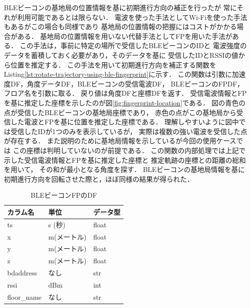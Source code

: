BLEビーコンの基地局の位置情報を基に初期進行方向の補正を行ったが
常にそれが利用可能であるとは限らない．
電波を使った手法としてWi-Fiを使った手法もあるがこの場合も同様であり
基地局の位置情報の把握にはコストがかかる場合がある．
基地局の位置情報を用いない代替手法としてFPを用いた手法がある．
この手法は，事前に特定の場所で受信したBLEビーコンのIDと
電波強度のデータを蓄積しておく必要があり，そのデータを基に
受信したIDとRSSIの値から位置を推定する．
この手法を用いて初期進行方向を補正する関数を
Listing\ref{lst:rotate-trajectory-using-ble-fingerprint}に示す．
この関数は引数に加速度DF，角度データDF，BLEビーコンの受信電波DF，
BLEビーコンのFPDF，フロア名を引数に取る．
戻り値は角度DFと座標DFを返す．
受信電波情報とFPを基に推定した座標を示したのが図\ref{fig:fingerprint-location}である．
図の青色の点が受信したBLEビーコンの基地局座標であり，
赤色の点がこの基地局から受信した電波とFPを基に位置を推定した座標である．
理解しやすいように図中では受信したIDが1つのみを表示しているが，
実際は複数の強い電波を受信した点が存在する．
また説明のために基地局情報を示しているが今回の使用ケースでは
この座標は判明していないのが前提である．
この関数の内部処理では上記で示した受信電波情報とFPを基に推定した座標と
推定軌跡の座標との距離の総和を用いて，
その和が最小となる角度を探す．
BLEビーコンの基地局情報を基に初期進行方向を回転させた際と，ほぼ同様の結果が得られた．


\begin{table}[ht]
	\centering
	\begin{tabular}{lll}
		\toprule
		カラム名        & 単位      & データ型  \\
		\midrule
		ts          & s (秒)   & float \\
		x           & m(メートル) & float \\
		y           & m(メートル) & float \\
		z           & m(メートル) & float \\
		bdaddress   & なし      & str   \\
		rssi        & dBm     & int   \\
		floor\_name & なし      & str   \\
		\bottomrule
	\end{tabular}
	\caption{BLEビーコンFPのDF}
	\label{table:ble-beacon-fingerprint-df}
\end{table}


